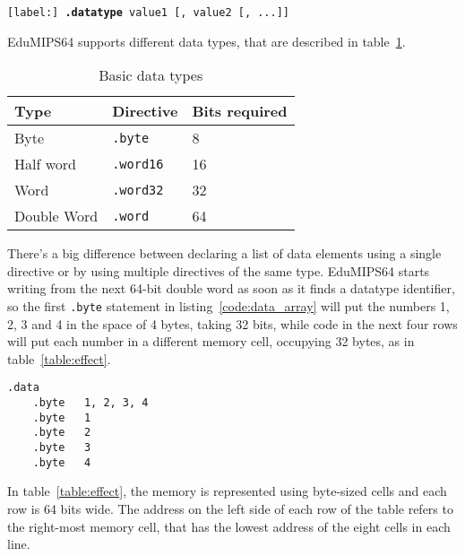 \documentclass[12pt]{report}
\newcommand{\EM}{EduMIPS64}
\begin{document}
\begin{center}
	\texttt{[label:] \textbf{.datatype} value1 [, value2 [, ...]]}
\end{center}

\EM{} supports different data types, that are described in
table~\ref{table:datatypes}.

\begin{table}[!htb]
	\begin{centering}
		\begin{tabular}{lll}
			\hline
			\hline
			Type & Directive & Bits required\\
			\hline
			Byte & \texttt{.byte} & 8\\
			Half word & \texttt{.word16} & 16\\
			Word & \texttt{.word32} & 32\\
			Double Word & \texttt{.word} & 64
		\end{tabular}
		\caption{Basic data types}
		\label{table:datatypes}
	\end{centering}
\end{table}

 There's a big difference between declaring a list of data elements
using a single directive or by using multiple directives of the same type. \EM{}
starts writing from the next 64-bit double word as soon as it finds a datatype identifier,
so the first \texttt{.byte} statement in listing~\ref{code:data_array} will put
the numbers 1, 2, 3 and 4 in the space of 4 bytes, taking 32 bits, while code in
the next four rows will put each number in a different memory cell, occupying 32
bytes, as in table~\ref{table:effect}.

\begin{lstlisting}[caption={Adjacent bytes}, label={code:data_array}, style={mips}]
	.data
	.byte	1, 2, 3, 4
	.byte	1
	.byte	2
	.byte	3
	.byte	4
\end{lstlisting}

In table~\ref{table:effect}, the memory is represented using byte-sized cells
and each row is 64 bits wide. The address on the left side of each row of the
table refers to the right-most memory cell, that has the lowest address of the
eight cells in each line.
\end{document}
